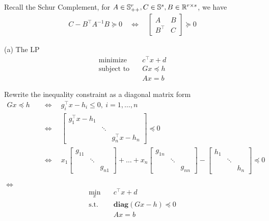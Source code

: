 \documentclass[11pt]{article}
\newcommand{\T}{^\top}
\begin{document}
Recall the Schur Complement, for $A\in{{\mathbb{S}}}^r_{++}, C\in{{\mathbb{S}}}^s, B\in{{\mathbb{R}}}^{r\times s}$, we have
\begin{align*}
  C - B\T A^{-1} B \succeq 0
  \quad \Leftrightarrow \quad
  \begin{bmatrix}
    A & B\\ B\T & C
  \end{bmatrix}
  \succeq 0 
\end{align*}

(a) The LP
\begin{align*}
  \text{minimize}\quad & c\T x + d\\
  \text{subject to}\quad 
  & Gx \preceq h\\
  & Ax = b
\end{align*}

Rewrite the inequality constraint as a diagonal matrix form
\begin{align*}
  Gx\preceq h \quad
  & \Leftrightarrow \quad g_i\T x - h_i \leq 0,\ i=1, \dots, n\\
  & \Leftrightarrow \quad \begin{bmatrix}
    g_1\T x - h_1 & & \\
     & \ddots & \\
     & & g_n\T x - h_n
  \end{bmatrix} \preceq 0\\
  & \Leftrightarrow \quad 
  x_1 
  \begin{bmatrix}
    g_{11} & & \\
     & \ddots & \\
     & & g_{n1}
  \end{bmatrix}
  + \dots +
  x_n
  \begin{bmatrix}
    g_{1n} & & \\
     & \ddots & \\
     & & g_{nn}
  \end{bmatrix}
  -
  \begin{bmatrix}
    h_1 & & \\
     & \ddots & \\
     & & h_n
  \end{bmatrix}
  \preceq 0
\end{align*}

$\Leftrightarrow$
\begin{align*}
  \min_x \quad & c\T x + d\\
  \text{s.t.}\quad 
  & \textbf{diag}(Gx - h) \preceq 0\\
  & Ax = b
\end{align*}
\end{document}
